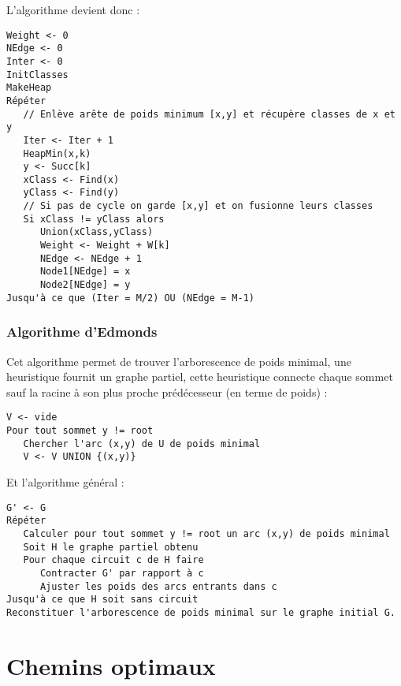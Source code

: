 \documentclass{article}
\begin{document}
\noindent L'algorithme devient donc : 
\begin{verbatim}
Weight <- 0
NEdge <- 0
Inter <- 0
InitClasses
MakeHeap
Répéter
   // Enlève arête de poids minimum [x,y] et récupère classes de x et y
   Iter <- Iter + 1
   HeapMin(x,k)
   y <- Succ[k]
   xClass <- Find(x)
   yClass <- Find(y)
   // Si pas de cycle on garde [x,y] et on fusionne leurs classes
   Si xClass != yClass alors
      Union(xClass,yClass)
      Weight <- Weight + W[k]
      NEdge <- NEdge + 1
      Node1[NEdge] = x
      Node2[NEdge] = y
Jusqu'à ce que (Iter = M/2) OU (NEdge = M-1)
\end{verbatim}

\subsubsection{Algorithme d'Edmonds}

Cet algorithme permet de trouver l'arborescence de poids minimal, une heuristique fournit un graphe partiel, cette heuristique connecte chaque sommet sauf la racine à son plus 
proche prédécesseur (en terme de poids) : 
\begin{verbatim}
V <- vide
Pour tout sommet y != root
   Chercher l'arc (x,y) de U de poids minimal
   V <- V UNION {(x,y)}
\end{verbatim}
Et l'algorithme général : 
\begin{verbatim}
G' <- G
Répéter
   Calculer pour tout sommet y != root un arc (x,y) de poids minimal
   Soit H le graphe partiel obtenu
   Pour chaque circuit c de H faire
      Contracter G' par rapport à c
      Ajuster les poids des arcs entrants dans c
Jusqu'à ce que H soit sans circuit
Reconstituer l'arborescence de poids minimal sur le graphe initial G.
\end{verbatim}

\section{Chemins optimaux}
\end{document}
